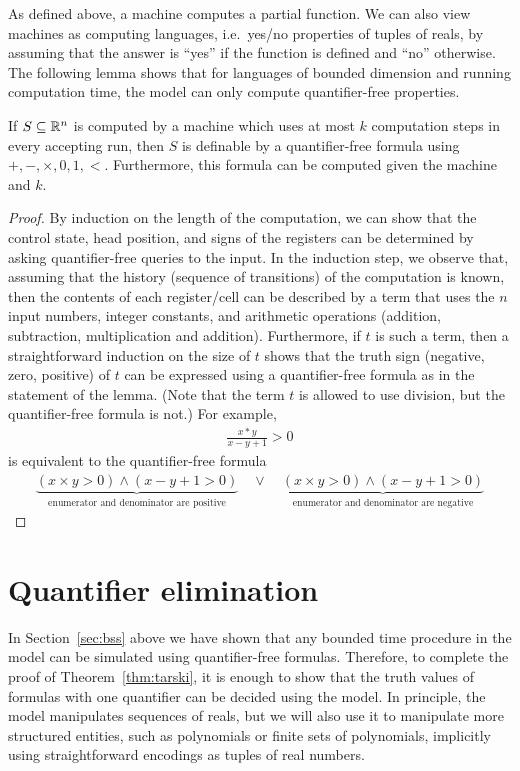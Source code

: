 As defined above, a \bss machine computes a partial function. We can also view \bss machines as computing languages, i.e.~yes/no properties of tuples of reals, by assuming that the answer is ``yes'' if the function is defined and ``no'' otherwise. The following lemma shows that for languages of bounded dimension and running computation time, the \bss model can only compute quantifier-free properties. 
\begin{lemma}\label{lem:bss-qf}
If $S \subseteq  \mathbb R^n$ is computed by a \bss machine which uses  at most $k$ computation steps in every accepting run, then $S$ is  definable by a quantifier-free formula using $+,-,\times,0,1,<$. Furthermore, this formula can be computed given the machine and $k$.
\end{lemma}
\begin{proof}
By 	induction on the length of the computation, we can show that the control state, head position,  and signs of the registers can be determined by asking  quantifier-free queries to the input. In the induction step, we observe that, assuming that the history (sequence of transitions) of the computation is known, then the contents of each register/cell can be described by a term that uses the $n$ input numbers, integer constants, and arithmetic operations (addition, subtraction, multiplication and addition). Furthermore, if $t$ is such a term, then a straightforward induction on the size of $t$ shows that  the truth sign (negative, zero, positive)  of  $t$ can be expressed using a quantifier-free formula as in the statement of the lemma. (Note that the term $t$ is allowed to use division, but the quantifier-free formula is not.) For example, 
\begin{align*}
 \frac {x * y } {x - y + 1} > 0
\end{align*}
is equivalent to the quantifier-free formula
\begin{align*}
\underbrace{(x \times y > 0) \land (x -y +1 >0)}_{\text{enumerator and denominator are positive}} \quad \lor \quad \underbrace{(x \times y > 0) \land (x -y +1 >0)}_{\text{enumerator and denominator are negative}}
\end{align*}
\end{proof}


\section{Quantifier elimination}
\label{sec:quantifier-elimination}
In Section~\ref{sec:bss} above we have shown that any bounded time procedure in the \bss model can be simulated using quantifier-free formulas. Therefore, to complete the proof of Theorem~\ref{thm:tarski}, it is enough to show that the truth values of formulas with one quantifier can be decided using the \bss model. In principle, the \bss model manipulates sequences of reals, but we will also use it to manipulate more structured entities, such as polynomials or finite sets of polynomials, implicitly using straightforward encodings as tuples of real numbers. 

